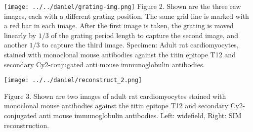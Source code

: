 \documentclass[portrait,final]{baposter}
\begin{document}
\begin{poster}
{\begin{multicols}{3}
    \begin{minipage}[h]{7.5cm}
      \texttt{[image: ../../daniel/grating-img.png]}
      {\smaller Figure 2. Shown are the three raw images, each with a
        different grating position. The same grid line is marked with
        a red bar in each image. After the first image is taken, the
        grating is moved linearly by $1/3$ of the grating period length
        to capture the second image, and another $1/3$ to capture the
        third image. Specimen: Adult rat cardiomyocytes, stained with
        monoclonal mouse antibodies against the titin epitope T12 and
        secondary Cy2-conjugated anti mouse immunoglobulin
        antibodies.}
    \end{minipage}
    \begin{minipage}[h]{7.5cm}
      \medskip
      \begin{center}
        \texttt{[image: ../../daniel/reconstruct\_2.png]}
      \end{center}
      {\smaller Figure 3. Shown are two images of adult rat
        cardiomyocytes stained with monoclonal mouse antibodies against
        the titin epitope T12 and secondary Cy2-conjugated anti mouse
        immunoglobulin antibodies. Left: widefield, Right: SIM
        reconstruction.}
    \end{minipage}
    

\end{multicols}}
\end{poster}
\end{document}
